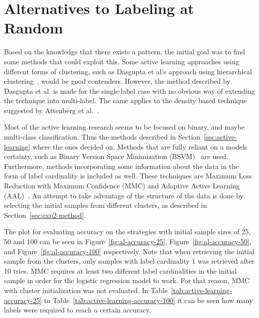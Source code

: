 \section{Alternatives to Labeling at Random}



Based on the knowledge that there exists a pattern, the initial goal was to find some methods that could exploit this.
Some active learning approaches using different forms of clustering, such as Dasgupta et al\@'s approach using hierarchical clustering~\cite{dasgupta2008hierarchical}, would be good contenders.
However, the method described by Dasgupta et al\@. is made for the single-label case with no obvious way of extending the technique into multi-label.
The same applies to the density based technique suggested by Attenberg et al\@.~\cite{attenberg2013class}.

Most of the active learning research seems to be focused on binary, and maybe multi-class classification.
Thus the methods described in Section~\ref{sec:active-learning} where the ones decided on.
Methods that are fully reliant on a models certainty, such as Binary Version Space Minimization (BSVM)~\cite{brinker2006active} are used.
Furthermore, methods incorporating some information about the data in the form of label cardinality is included as well.
These techniques are Maximum Loss Reduction with Maximum Confidence (MMC) and Adaptive Active Learning (AAL)~\cite{yang2009effective, li2013active}.
An attempt to take advantage of the structure of the data is done by selecting the initial samples from different clusters, as described in Section~\ref{sec:exp2-method}.

The plot for evaluating accuracy on the strategies with initial sample sizes of 25, 50 and 100 can be seen in Figure~\ref{fig:al-accuracy-25}, Figure~\ref{fig:al-accuracy-50}, and Figure~\ref{fig:al-accuracy-100} respectively.
Note that when retrieving the initial sample from the clusters, only samples with label cardinality 1 was retrieved after 10 tries.
MMC requires at least two different label cardinalities in the initial sample in order for the logistic regression model to work.
For that reason, MMC with cluster initialization was not evaluated.
In Table~\ref{tab:active-learning-accuracy-25} to Table~\ref{tab:active-learning-accuracy-100} it can be seen how many labels were required to reach a certain accuracy.


